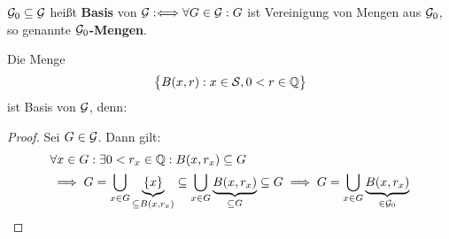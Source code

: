 \begin{definition} %
$\mathcal{G}_0\subseteq\mathcal{G}$ heißt \textbf{Basis} von $\mathcal{G}:\Longleftrightarrow\forall G\in\mathcal{G}:G$ ist Vereinigung von Mengen aus $\mathcal{G}_0$, so genannte \textbf{$\mathcal{G}_0$-Mengen}.
\end{definition}

\begin{beispiel} %
Die Menge
\begin{align*}
\big\lbrace B(x,r):x\in\mathcal{S},0<r\in\mathbb{Q}\big\rbrace
\end{align*}
ist Basis von $\mathcal{G}$, denn:
\begin{proof}
Sei $G\in\mathcal{G}$. Dann gilt:
\begin{align*}
&\forall x\in G:\exists 0<r_x\in\mathbb{Q}:B(x,r_x)\subseteq G\\
&\implies
G=\bigcup\limits_{x\in G}\underbrace{\lbrace x\rbrace}_{\subseteq B(x,r_x)}\subseteq\bigcup\limits_{x\in G} \underbrace{B(x,r_x)}_{\subseteq G}\subseteq G\implies G=\bigcup\limits_{x\in G} \underbrace{B(x,r_x)}_{\in\mathcal{G}_0}
\end{align*}
\end{proof}
\end{beispiel}

